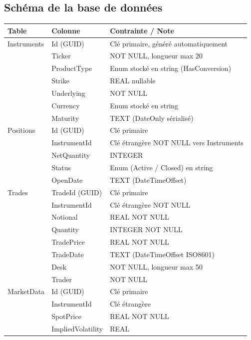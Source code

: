 \documentclass[a4paper,11pt]{article}
\begin{document}
\subsection{Schéma de la base de données}

\begin{center}
\begin{tabularx}{\textwidth}{>{\ttfamily}l >{\ttfamily}l X}
\toprule
\textbf{Table} & \textbf{Colonne} & \textbf{Contrainte / Note} \\
\midrule
Instruments & Id (GUID) & Clé primaire, généré automatiquement \\
            & Ticker & NOT NULL, longueur max 20 \\
            & ProductType & Enum stocké en string (HasConversion) \\
            & Strike & REAL nullable \\
            & Underlying & NOT NULL \\
            & Currency & Enum stocké en string \\
            & Maturity & TEXT (DateOnly sérialisé) \\
\midrule
Positions & Id (GUID) & Clé primaire \\
          & InstrumentId & Clé étrangère NOT NULL vers Instruments \\
          & NetQuantity & INTEGER \\
          & Status & Enum (Active / Closed) en string \\
          & OpenDate & TEXT (DateTimeOffset) \\
\midrule
Trades & TradeId (GUID) & Clé primaire \\
       & InstrumentId & Clé étrangère NOT NULL \\
       & Notional & REAL NOT NULL \\
       & Quantity & INTEGER NOT NULL \\
       & TradePrice & REAL NOT NULL \\
       & TradeDate & TEXT (DateTimeOffset ISO8601) \\
       & Desk & NOT NULL, longueur max 50 \\
       & Trader & NOT NULL \\
\midrule
MarketData & Id (GUID) & Clé primaire \\
           & InstrumentId & Clé étrangère \\
           & SpotPrice & REAL NOT NULL \\
           & ImpliedVolatility & REAL \\

\end{tabularx}
\end{center}
\end{document}
